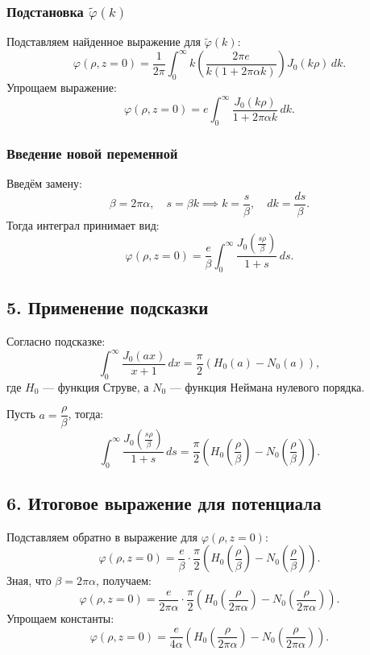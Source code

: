 \documentclass{article}
\begin{document}
\subsubsection*{Подстановка \( \tilde{\varphi}(k) \)}

Подставляем найденное выражение для \( \tilde{\varphi}(k) \):
\[
\varphi(\rho, z = 0) = \frac{1}{2\pi} \int_0^\infty k \left( \frac{2\pi e}{k \left(1 + 2\pi \alpha k\right)} \right) J_0(k \rho) \, dk.
\]
Упрощаем выражение:
\[
\varphi(\rho, z = 0) = e \int_0^\infty \frac{J_0(k \rho)}{1 + 2\pi \alpha k} \, dk.
\]

\subsubsection*{Введение новой переменной}

Введём замену:
\[
\beta = 2\pi \alpha, \quad s = \beta k \implies k = \frac{s}{\beta}, \quad dk = \frac{ds}{\beta}.
\]
Тогда интеграл принимает вид:
\[
\varphi(\rho, z = 0) = \frac{e}{\beta} \int_0^\infty \frac{J_0\left( \frac{s \rho}{\beta} \right)}{1 + s} \, ds.
\]

\subsection*{5. Применение подсказки}

Согласно подсказке:
\[
\int_0^\infty \frac{J_0(a x)}{x + 1} \, dx = \frac{\pi}{2} \left( H_0(a) - N_0(a) \right),
\]
где \( H_0 \) — функция Струве, а \( N_0 \) — функция Неймана нулевого порядка.

Пусть \( a = \dfrac{\rho}{\beta} \), тогда:
\[
\int_0^\infty \frac{J_0\left( \frac{s \rho}{\beta} \right)}{1 + s} \, ds = \frac{\pi}{2} \left( H_0\left( \frac{\rho}{\beta} \right) - N_0\left( \frac{\rho}{\beta} \right) \right).
\]

\subsection*{6. Итоговое выражение для потенциала}

Подставляем обратно в выражение для \( \varphi(\rho, z = 0) \):
\[
\varphi(\rho, z = 0) = \frac{e}{\beta} \cdot \frac{\pi}{2} \left( H_0\left( \frac{\rho}{\beta} \right) - N_0\left( \frac{\rho}{\beta} \right) \right).
\]
Зная, что \( \beta = 2\pi \alpha \), получаем:
\[
\varphi(\rho, z = 0) = \frac{e}{2\pi \alpha} \cdot \frac{\pi}{2} \left( H_0\left( \frac{\rho}{2\pi \alpha} \right) - N_0\left( \frac{\rho}{2\pi \alpha} \right) \right).
\]
Упрощаем константы:
\[
\varphi(\rho, z = 0) = \frac{e}{4 \alpha} \left( H_0\left( \frac{\rho}{2\pi \alpha} \right) - N_0\left( \frac{\rho}{2\pi \alpha} \right) \right).
\]
\end{document}
